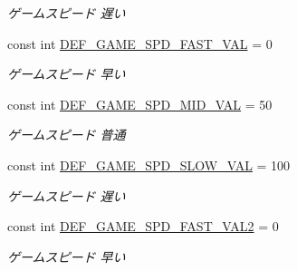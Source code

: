 \begin{DoxyCompactItemize}
\begin{DoxyCompactList}\small\item\em ゲームスピード 遅い \end{DoxyCompactList}\item 
\mbox{\label{class_reversi4color_form_1_1_reversi_const_aa340476c7d794d0bcc4b5b030b830858}} 
const int \hyperlink{class_reversi4color_form_1_1_reversi_const_aa340476c7d794d0bcc4b5b030b830858}{D\+E\+F\+\_\+\+G\+A\+M\+E\+\_\+\+S\+P\+D\+\_\+\+F\+A\+S\+T\+\_\+\+V\+AL} = 0
\begin{DoxyCompactList}\small\item\em ゲームスピード 早い \end{DoxyCompactList}\item 
\mbox{\label{class_reversi4color_form_1_1_reversi_const_a858a40772637c899bdf127fb39659478}} 
const int \hyperlink{class_reversi4color_form_1_1_reversi_const_a858a40772637c899bdf127fb39659478}{D\+E\+F\+\_\+\+G\+A\+M\+E\+\_\+\+S\+P\+D\+\_\+\+M\+I\+D\+\_\+\+V\+AL} = 50
\begin{DoxyCompactList}\small\item\em ゲームスピード 普通 \end{DoxyCompactList}\item 
\mbox{\label{class_reversi4color_form_1_1_reversi_const_a991022989fa2b3951961f0eeddcdf8b5}} 
const int \hyperlink{class_reversi4color_form_1_1_reversi_const_a991022989fa2b3951961f0eeddcdf8b5}{D\+E\+F\+\_\+\+G\+A\+M\+E\+\_\+\+S\+P\+D\+\_\+\+S\+L\+O\+W\+\_\+\+V\+AL} = 100
\begin{DoxyCompactList}\small\item\em ゲームスピード 遅い \end{DoxyCompactList}\item 
\mbox{\label{class_reversi4color_form_1_1_reversi_const_ae88f739d838ef70888bac68c5ca15abb}} 
const int \hyperlink{class_reversi4color_form_1_1_reversi_const_ae88f739d838ef70888bac68c5ca15abb}{D\+E\+F\+\_\+\+G\+A\+M\+E\+\_\+\+S\+P\+D\+\_\+\+F\+A\+S\+T\+\_\+\+V\+A\+L2} = 0
\begin{DoxyCompactList}\small\item\em ゲームスピード 早い \end{DoxyCompactList}\item 

\end{DoxyCompactItemize}
